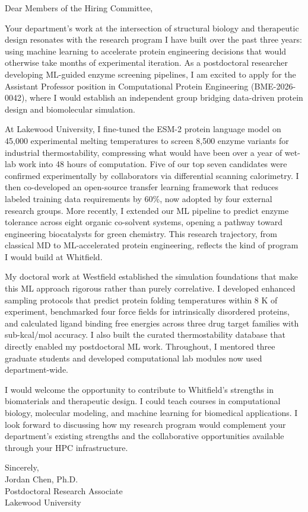 \documentclass[11pt,a4paper,roman]{moderncv}
\begin{document}
\date{\today}
\opening{Dear Members of the Hiring Committee,}
\makelettertitle

\begin{justify}
Your department's work at the intersection of structural biology and therapeutic design resonates with the research program I have built over the past three years: using machine learning to accelerate protein engineering decisions that would otherwise take months of experimental iteration. As a postdoctoral researcher developing ML-guided enzyme screening pipelines, I am excited to apply for the Assistant Professor position in Computational Protein Engineering (BME-2026-0042), where I would establish an independent group bridging data-driven protein design and biomolecular simulation.

At Lakewood University, I fine-tuned the ESM-2 protein language model on 45,000 experimental melting temperatures to screen 8,500 enzyme variants for industrial thermostability, compressing what would have been over a year of wet-lab work into 48 hours of computation. Five of our top seven candidates were confirmed experimentally by collaborators via differential scanning calorimetry. I then co-developed an open-source transfer learning framework that reduces labeled training data requirements by 60\%, now adopted by four external research groups. More recently, I extended our ML pipeline to predict enzyme tolerance across eight organic co-solvent systems, opening a pathway toward engineering biocatalysts for green chemistry. This research trajectory, from classical MD to ML-accelerated protein engineering, reflects the kind of program I would build at Whitfield.

My doctoral work at Westfield established the simulation foundations that make this ML approach rigorous rather than purely correlative. I developed enhanced sampling protocols that predict protein folding temperatures within 8 K of experiment, benchmarked four force fields for intrinsically disordered proteins, and calculated ligand binding free energies across three drug target families with sub-kcal/mol accuracy. I also built the curated thermostability database that directly enabled my postdoctoral ML work. Throughout, I mentored three graduate students and developed computational lab modules now used department-wide.

I would welcome the opportunity to contribute to Whitfield's strengths in biomaterials and therapeutic design. I could teach courses in computational biology, molecular modeling, and machine learning for biomedical applications. I look forward to discussing how my research program would complement your department's existing strengths and the collaborative opportunities available through your HPC infrastructure.
\end{justify}

\vspace{0.3cm}
{Sincerely,\\
Jordan Chen, Ph.D.\\
Postdoctoral Research Associate\\
Lakewood University}
\end{document}
